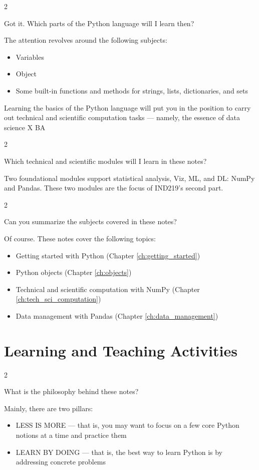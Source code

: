 \documentclass[a4paper,11pt]{book}
\newcommand{\question}[1]{%
    \begin{tcolorbox}[colback=comp_c!10,colframe=comp_c,sidebyside align=top,width=\linewidth,before skip=1ex]
        #1
    \end{tcolorbox}
    \switchcolumn%
}
\newcommand{\note}[1]{%
    \begin{tcolorbox}[colback=white!0,colframe=white!10,width=\linewidth,before skip=1ex]
        #1
    \end{tcolorbox}
}
\begin{document}
\begin{paracol}{2}
	\question{\raggedright Got it. Which parts of the Python language will I learn then?}
	\note{

	The attention revolves around the following subjects:

		\begin{itemize}
			\item Variables
			\item Object
			\item Some built-in functions and methods for strings, lists, dictionaries, and sets
		\end{itemize}
	
	\quad Learning the basics of the Python language will put you in the position to carry out technical and scientific computation tasks --- namely, the essence of data science X BA
	}
\end{paracol}

\begin{paracol}{2}
	\question{\raggedright Which technical and scientific modules will I learn in these notes?}
	\note{Two foundational modules support statistical analysis, Viz, ML, and DL: NumPy and Pandas. These two modules are the focus of IND219's second part.
	}
\end{paracol}

\begin{paracol}{2}
	\question{\raggedright Can you summarize the subjects covered in these notes?}
	\note{Of course. These notes cover the following topics:
	
	\begin{itemize}
		\item Getting started with Python (Chapter \ref{ch:getting_started})
		\item Python objects (Chapter \ref{ch:objects})
		\item Technical and scientific computation with NumPy (Chapter \ref{ch:tech_sci_computation})
		\item Data management with Pandas (Chapter \ref{ch:data_management})
	\end{itemize}
	}
\end{paracol}

\section{Learning and Teaching Activities}

\begin{paracol}{2}
	\question{\raggedright What is the philosophy behind these notes?}
	\note{Mainly, there are two pillars:
	
	\begin{itemize}
		\item LESS IS MORE --- that is, you may want to focus on a few core Python notions at a time and practice them
		\item LEARN BY DOING --- that is, the best way to learn Python is by addressing concrete problems
	\end{itemize}
	
	}
\end{paracol}
\clearpage
\end{document}
